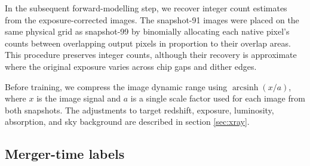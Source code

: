 In the subsequent forward-modelling step, we recover integer count estimates from the exposure-corrected images.
The snapshot-91 images were placed on the same physical grid as snapshot-99 by binomially allocating each native pixel's counts between overlapping output pixels in proportion to their overlap areas.
This procedure preserves integer counts, although their recovery is approximate where the original exposure varies across chip gaps and dither edges.

Before training, we compress the image dynamic range using $\operatorname{arcsinh}(x/a)$, where $x$ is the image signal and $a$ is a single scale factor used for each image from both snapshots.
The adjustments to target redshift, exposure, luminosity, absorption, and sky background are described in section \ref{sec:xray}.

\subsection{Merger-time labels}

